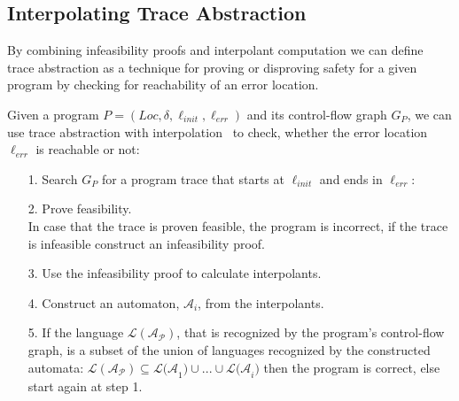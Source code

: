 \documentclass{article}
\newcommand{\Loc}{\ensuremath{\mathit{Loc}}\xspace}
\newcommand{\err}{\ensuremath{\mathit{err}}\xspace}
\newcommand{\init}{\ensuremath{\mathit{init}}\xspace}
\newcommand\mycom[1]{}
\newcommand\mycom[1]{#1}
\newcommand{\dd}[1]{\mycom{\todo[color=orange!40,inline]{\small DD: #1}}}
\newcommand{\ts}[1]{\mycom{\todo[color=green!40,inline]{\small TS: #1}}}
\begin{document}
\subsection{Interpolating Trace Abstraction}
\dd{Why is this section called \emph{Interpolating} TA? Why not just TA?}
By combining infeasibility proofs and interpolant computation we can define trace abstraction as a technique for proving or disproving safety for a given program by checking for reachability of an error location.
\ts{What do you want to say with this phrase?}
Given a program $P = (\Loc, \delta, \ell_\init, \ell_\err)$ and its control-flow graph $G_P$, we can use trace abstraction with interpolation~\cite{10.1007/978-3-642-03237-0_7} to check, whether the error location $\ell_{err}$ is reachable or not:
\begin{itemize}
    \item[1.] Search $G_P$ for a program trace that starts at $\ell_\init$ and ends in $\ell_\err$:
    \begin{figure}[H]
        \centering
    \end{figure}

    \item[2.] Prove feasibility. \\ 
    In case that the trace is proven feasible, the program is incorrect, if the trace is infeasible construct an infeasibility proof.
    
    \item[3.] Use the infeasibility proof to calculate interpolants.
    \item[4.] Construct an automaton, $\mathcal{A}_i$, from the interpolants.
    \item[5.] If the language $\mathcal{L(A_P)}$, that is recognized by the program's control-flow graph, is a subset of the union of languages recognized by the constructed automata: $\mathcal{L(A_P)} \subseteq \mathcal{L(A}_1) \cup ... \cup \mathcal{L(A}_i)$ then the program is correct, else start again at step 1.
\end{itemize}
\end{document}
